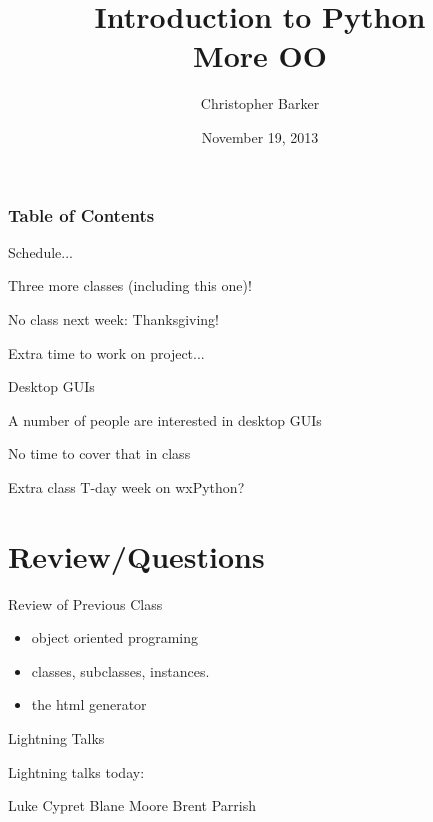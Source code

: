 \documentclass{beamer}
\title[Intro to Python: Week 8]{Introduction  to Python\\ More OO}
\author{Christopher Barker}
\institute{UW Continuing Education}
\date{November 19, 2013}
\begin{document}
\begin{frame}
  \titlepage
\end{frame}

\begin{frame}
\frametitle{Table of Contents}
  \tableofcontents
\end{frame}

\begin{frame}{Schedule...}

\vfill
{\Large Three more classes (including this one)!}

\vfill
{\Large No class next week: Thanksgiving!}

\vfill
{\Large Extra time to work on project...}

\end{frame}

\begin{frame}{Desktop GUIs}

\vfill
{\Large A number of people are interested in desktop GUIs}

\vfill
{\Large No time to cover that in class}

\vfill
{\Large Extra class T-day week on wxPython?}

\end{frame}


\section{Review/Questions}

\begin{frame}{Review of Previous Class}

\begin{itemize}
  \item object oriented programing
  \item classes, subclasses, instances.
  \item the html generator
\end{itemize}

\end{frame}


\begin{frame}{Lightning Talks}

\vfill
{\LARGE Lightning talks today:}

\vfill
{\Large
Luke Cypret
\vfill
Blane Moore
\vfill
Brent Parrish
\vfill
}

\vfill

\end{frame}
\end{document}
